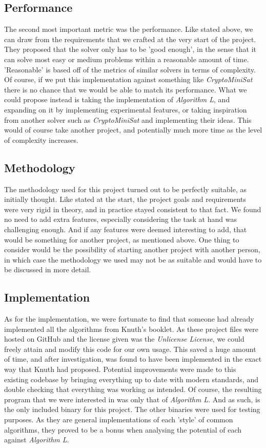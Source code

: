 \documentclass{article}
\begin{document}
\subsection{Performance}
The second most important metric was the performance. Like stated above, we can draw from the requirements that we crafted at the
very start of the project. They proposed that the solver only has to be 'good enough', in the sense that it can solve most easy or
medium problems within a reasonable amount of time. 'Reasonable' is based off of the metrics of similar solvers in terms of
complexity. Of course, if we put this implementation against something like \textit{CryptoMiniSat} there is no chance that we
would be able to match its performance. What we could propose instead is taking the implementation of \textit{Algorithm L}, and
expanding on it by implementing experimental features, or taking inspiration from another solver such as \textit{CryptoMiniSat}
and implementing their ideas. This would of course take another project, and potentially much more time as the level of complexity
increases.

\subsection{Methodology}
The methodology used for this project turned out to be perfectly suitable, as initially thought. Like stated at the start, the
project goals and requirements were very rigid in theory, and in practice stayed consistent to that fact. We found no need to add
extra features, especially considering the task at hand was challenging enough. And if any features were deemed interesting to
add, that would be something for another project, as mentioned above. One thing to consider would be the possibility of starting
another project with another person, in which case the methodology we used may not be as suitable and would have to be discussed
in more detail.

\subsection{Implementation}
As for the implementation, we were fortunate to find that someone had already implemented all the algorithms from Knuth's booklet.
As these project files were hosted on GitHub\cite{aaw} and the license given was the \textit{Unlicense License}, we could freely
attain and modify this code for our own usage. This saved a huge amount of time, and after investigation, was found to have been
implemented in the exact way that Knuth had proposed. Potential improvements were made to this existing codebase by bringing
everything up to date with modern standards, and double checking that everything was working as intended. Of course, the resulting
program that we were interested in was only that of \textit{Algorithm L}. And as such, is the only included binary for this
project. The other binaries were used for testing purposes. As they are general implementations of each 'style' of common
algorithms, they proved to be a bonus when analysing the potential of each against \textit{Algorithm L}.
\end{document}
